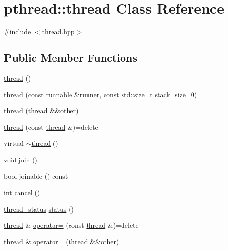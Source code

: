 \hypertarget{classpthread_1_1thread}{\section{pthread\+:\+:thread Class Reference}
\label{classpthread_1_1thread}
}


{\ttfamily \#include $<$thread.\+hpp$>$}

\subsection*{Public Member Functions}
\begin{DoxyCompactItemize}
\item 
\hyperlink{classpthread_1_1thread_a60ac91ccf3de6e36258aa741af015095}{thread} ()
\item 
\hyperlink{classpthread_1_1thread_aaf360cff96e50499872bd147e85ba3ac}{thread} (const \hyperlink{classpthread_1_1runnable}{runnable} \&runner, const std\+::size\+\_\+t stack\+\_\+size=0)
\item 
\hyperlink{classpthread_1_1thread_a928b41a7587eba3e5e39237b4b2f655a}{thread} (\hyperlink{classpthread_1_1thread}{thread} \&\&other)
\item 
\hyperlink{classpthread_1_1thread_ab9ddf5aa6697287269dc2804051b6378}{thread} (const \hyperlink{classpthread_1_1thread}{thread} \&)=delete
\item 
virtual \hyperlink{classpthread_1_1thread_aa4920e15c3a033f94c6be462c5cbcecf}{$\sim$thread} ()
\item 
void \hyperlink{classpthread_1_1thread_a90ab4afc041cf26d9fd4b289bf0224c8}{join} ()
\item 
bool \hyperlink{classpthread_1_1thread_a14b07d05a78157bcb5ee42fc8dd17e35}{joinable} () const 
\item 
int \hyperlink{classpthread_1_1thread_a89b64810871feee5c2d2659f3ae2f668}{cancel} ()
\item 
\hyperlink{namespacepthread_ac4b6e78f3d72c946ace7a92f3bec4101}{thread\+\_\+status} \hyperlink{classpthread_1_1thread_a3e49c7d73cb8411258790ed2fc0cd818}{status} ()
\item 
\hyperlink{classpthread_1_1thread}{thread} \& \hyperlink{classpthread_1_1thread_a09903f6b3f396f2ea046c9c1606f0f61}{operator=} (const \hyperlink{classpthread_1_1thread}{thread} \&)=delete
\item 
\hyperlink{classpthread_1_1thread}{thread} \& \hyperlink{classpthread_1_1thread_a8f9ab7d43ad9aee0368ccc4778cf40d0}{operator=} (\hyperlink{classpthread_1_1thread}{thread} \&\&other)
\end{DoxyCompactItemize}


